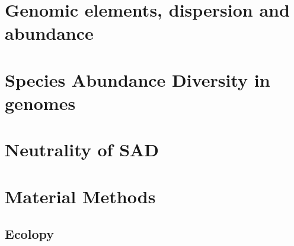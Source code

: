 
\section{Genomic elements, dispersion and abundance}

\section{Species Abundance Diversity in genomes}

\section{Neutrality of SAD}

\section{Material Methods}
\subsection{Ecolopy}
